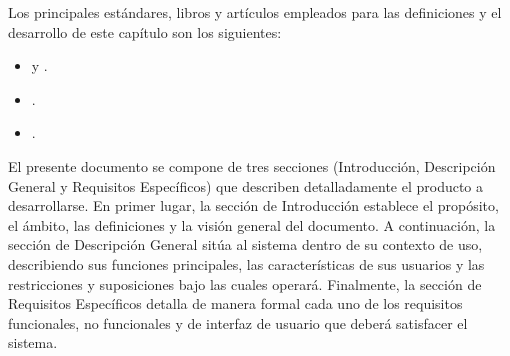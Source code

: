 \label{sec:ieee_referencias}

Los principales estándares, libros y artículos empleados para las definiciones y el desarrollo de este capítulo son los siguientes:

\begin{itemize}
    \item \textcite{ieee830_1998} y \textcite{iso29148_2011}.
    \item \textcite{pressman2010ingenieria}.
    \item \textcite{sommerville2011ingenieria}.
\end{itemize}

\label{sec:ieee_vision_general}

El presente documento se compone de tres secciones (Introducción, Descripción General y Requisitos Específicos) que describen detalladamente el producto a desarrollarse. En primer lugar, la sección de Introducción establece el propósito, el ámbito, las definiciones y la visión general del documento. A continuación, la sección de Descripción General sitúa al sistema dentro de su contexto de uso, describiendo sus funciones principales, las características de sus usuarios y las restricciones y suposiciones bajo las cuales operará. Finalmente, la sección de Requisitos Específicos detalla de manera formal cada uno de los requisitos funcionales, no funcionales y de interfaz de usuario que deberá satisfacer el sistema.
